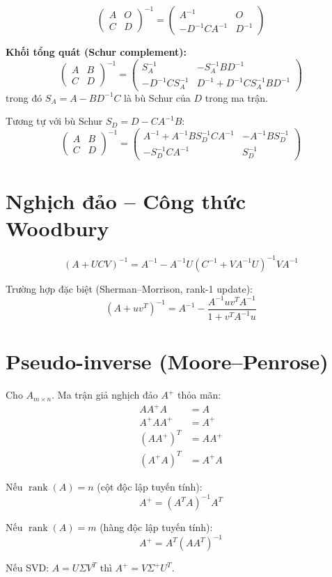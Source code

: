 \[
\begin{pmatrix} A & O \\ C & D \end{pmatrix}^{-1}
= \begin{pmatrix} A^{-1} & O \\ -D^{-1}CA^{-1} & D^{-1} \end{pmatrix}
\]

\textbf{Khối tổng quát (Schur complement):}
\[
\begin{pmatrix} A & B \\ C & D \end{pmatrix}^{-1}
= \begin{pmatrix}
S_A^{-1} & -S_A^{-1}BD^{-1} \\
-D^{-1}CS_A^{-1} & D^{-1} + D^{-1}CS_A^{-1}BD^{-1}
\end{pmatrix}
\]
trong đó $S_A = A - BD^{-1}C$ là bù Schur của $D$ trong ma trận.

Tương tự với bù Schur $S_D = D - CA^{-1}B$:
\[
\begin{pmatrix} A & B \\ C & D \end{pmatrix}^{-1}
= \begin{pmatrix}
A^{-1} + A^{-1}BS_D^{-1}CA^{-1} & -A^{-1}BS_D^{-1} \\
-S_D^{-1}CA^{-1} & S_D^{-1}
\end{pmatrix}
\]

\section{Nghịch đảo -- Công thức Woodbury}

\[
(A + UCV)^{-1} = A^{-1} - A^{-1}U(C^{-1} + VA^{-1}U)^{-1}VA^{-1}
\]

Trường hợp đặc biệt (Sherman--Morrison, rank-1 update):
\[
(A + uv^T)^{-1} = A^{-1} - \frac{A^{-1}uv^T A^{-1}}{1 + v^T A^{-1} u}
\]

\section{Pseudo-inverse (Moore--Penrose)}

Cho $A_{m \times n}$. Ma trận giả nghịch đảo $A^+$ thỏa mãn:
\begin{align}
AA^+A &= A \\
A^+AA^+ &= A^+ \\
(AA^+)^T &= AA^+ \\
(A^+A)^T &= A^+A
\end{align}

Nếu $\operatorname{rank}(A) = n$ (cột độc lập tuyến tính):
\[
A^+ = (A^T A)^{-1} A^T
\]

Nếu $\operatorname{rank}(A) = m$ (hàng độc lập tuyến tính):
\[
A^+ = A^T(AA^T)^{-1}
\]

Nếu SVD: $A = U\Sigma V^T$ thì $A^+ = V\Sigma^+ U^T$.

